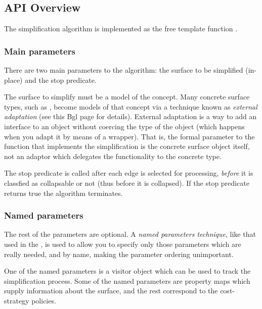\subsection{API Overview}

The simplification algorithm is implemented as the free template function 
.

\subsubsection{Main parameters}

There are two main parameters to the algorithm: the surface to be simplified (in-place) and the stop predicate.

The surface to simplify must be a model of the  concept. 
Many concrete surface types, such as , become models of 
that concept via a technique known as 
{\em external adaptation} 
(see 
{this Bgl page for details}). External adaptation is a way to add an interface to an 
object without coercing the type of the object (which happens when you adapt it by means 
of a wrapper). That is, the formal parameter to the  function that 
implements the simplification is the concrete surface object itself, not an adaptor 
which delegates the functionality to the concrete type.

The stop predicate is called after each edge is selected for processing, {\em before} 
it is classfied as collapsable or not (thus before it is collapsed). If the stop predicate 
returns true the algorithm terminates.

\subsubsection{Named parameters}

The rest of the parameters are optional. 
A {\em named parameters technique}, like that used in the 
,
is used to allow you to specify only those parameters which are really needed,
and by name, making the parameter ordering unimportant. 

One of the named parameters is a visitor object which can be used to track the simplification 
process. Some of the named parameters are property maps which supply information about 
the surface, and the rest correspond to the cost-strategy policies. 

